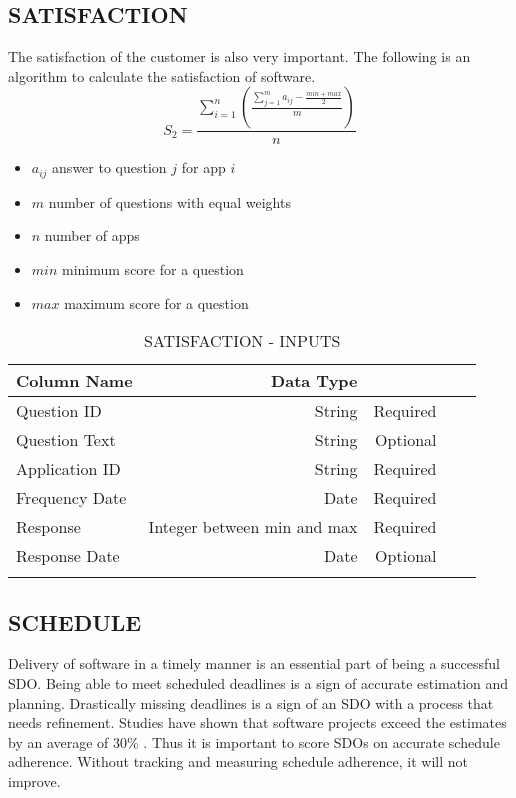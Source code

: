 \documentclass[SDSUThesis.tex]{subfiles}
\begin{document}
\subsection{SATISFACTION}
The satisfaction of the customer is also very important.  The following is an algorithm to calculate the satisfaction of software.
\[
    S_2 = \frac{\sum^n_{i=1}\left( \frac{\sum^m_{j=1}a_{ij}- \frac{min + max}{2}}{m}  \right)}{n}
\]

\begin{itemize}
\item $a_{i j}$ answer to question $j$ for app $i$
\item $m$ number of questions with equal weights
\item $n$ number of apps
\item $min$ minimum score for a question
\item $max$ maximum score for a question
\end{itemize}

\begin{longtable}{@{}l rr rr}

\toprule%
 \centering%
 {\bfseries Column Name}
 & {\bfseries Data Type}
 &  \\

\cmidrule[0.4pt](r{0.125em}){1-1}%
\cmidrule[0.4pt](lr{0.125em}){2-2}%
\cmidrule[0.4pt](l{0.125em}){3-3}%
\endhead

Question ID & String  & Required \\
\myrowcolour%
Question Text & String  & Optional \\
Application ID & String & Required \\
\myrowcolour%
Frequency Date & Date & Required \\
Response & Integer between min and max  & Required \\
\myrowcolour%
Response Date & Date & Optional \\

\bottomrule

\caption{SATISFACTION - INPUTS}
\label{tab:satisfaction}
\end{longtable}


\subsection{SCHEDULE}  

        Delivery of software in a timely manner is an essential part of being a 
        successful SDO.  Being able to meet scheduled deadlines is a sign of accurate
        estimation and planning.  Drastically missing deadlines is a sign of an SDO
        with a process that needs refinement.  Studies have shown that 
        software projects exceed the estimates by an average of
        30\% \cite{Jorgensen2014}.  Thus it is important to score SDOs on accurate
        schedule adherence. Without tracking and measuring schedule adherence, it will
        not improve.  
        
\end{document}
